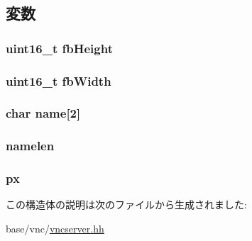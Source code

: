 \subsection{変数}
\hypertarget{structVncServer_1_1ServerInitMsg_ab6718ea70335e6a9b1bbe1d3ca47dfc9}{
\subsubsection[{fbHeight}]{\setlength{\rightskip}{0pt plus 5cm}uint16\_\-t {\bf fbHeight}}}
\label{structVncServer_1_1ServerInitMsg_ab6718ea70335e6a9b1bbe1d3ca47dfc9}
\hypertarget{structVncServer_1_1ServerInitMsg_acddb57186e2184c61efc8f0b3ff8cc0d}{
\subsubsection[{fbWidth}]{\setlength{\rightskip}{0pt plus 5cm}uint16\_\-t {\bf fbWidth}}}
\label{structVncServer_1_1ServerInitMsg_acddb57186e2184c61efc8f0b3ff8cc0d}
\hypertarget{structVncServer_1_1ServerInitMsg_ab2726dd451e7676f553e96d5620bdfe3}{
\subsubsection[{name}]{\setlength{\rightskip}{0pt plus 5cm}char {\bf name}\mbox{[}2\mbox{]}}}
\label{structVncServer_1_1ServerInitMsg_ab2726dd451e7676f553e96d5620bdfe3}
\hypertarget{structVncServer_1_1ServerInitMsg_a60a1b79d3f807e575fa2073abc688d7f}{
\subsubsection[{namelen}]{ {\bf namelen}}}
\label{structVncServer_1_1ServerInitMsg_a60a1b79d3f807e575fa2073abc688d7f}
\hypertarget{structVncServer_1_1ServerInitMsg_a07ef974d3a4dd48ea4b0b1decc3732e2}{
\subsubsection[{px}]{ {\bf px}}}
\label{structVncServer_1_1ServerInitMsg_a07ef974d3a4dd48ea4b0b1decc3732e2}


この構造体の説明は次のファイルから生成されました:\begin{DoxyCompactItemize}
\item 
base/vnc/\hyperlink{vncserver_8hh}{vncserver.hh}\end{DoxyCompactItemize}
